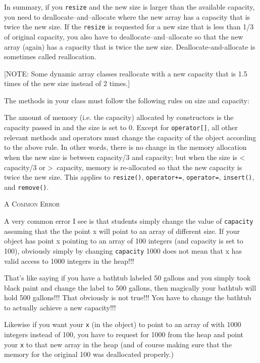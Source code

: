 In summary, if you \verb!resize! and the new size is
larger than the available capacity, you need to
deallocate--and--allocate where the new array
has a capacity that is twice the new size.
If the \verb!resize! is requested for a new size that is
less than 1/3 of original capacity,
you also have to deallocate--and--allocate
so that the new array (again) has a capacity
that is twice the new size.
Deallocate-and-allocate is sometimes called reallocation.

[NOTE:
Some dynamic array classes
reallocate with a new capacity that is
1.5 times of the new size instead of 2 times.]


The methods in your class must follow the following rules on size and capacity:
\begin{tightlist}
  \li The amount of memory (i.e. the capacity) allocated by constructors
  is the capacity passed in and the size is set to 0.
\li Except for \verb!operator[]!, all other relevant methods and operators 
must change the capacity of the object according to the above rule. In 
other words, there is no change in the memory allocation when the 
new size is between capacity/3 and capacity; but when the size is \textless
\, capacity/3 or \textgreater \, capacity, memory is re-allocated so that the new capacity 
is twice the new size. This applies to \verb!resize()!, \verb!operator+=!, 
\verb!operator=!, \verb!insert()!, and \verb!remove()!.
\end{tightlist}

\newpage
\textsc{A Common Error}

A very common error I see is that students simply change the value of 
\verb!capacity! assuming that the the point x will point to an array of 
different size. If your object has point x pointing to an array of 100 
integers (and capacity is set to 100), obviously simply by changing 
\verb!capacity! 1000 does not mean that x has valid access to 1000 
integers in the heap!!!

That's like saying if you have a bathtub labeled 50 gallons and you 
simply took black paint and change the label to 500 gallons,
then magically
your 
bathtub will hold 500 gallons!!! That obviously is not true!!! You have 
to change the bathtub to actually achieve a new capacity!!!

Likewise if you want your \verb!x! (in the object) to point to an array of 
with 1000 integers instead of 100, you have to request for 1000 from 
the heap and point your \verb!x! to that new array in the heap (and of course 
making sure that the memory for the original 100 was deallocated properly.)


